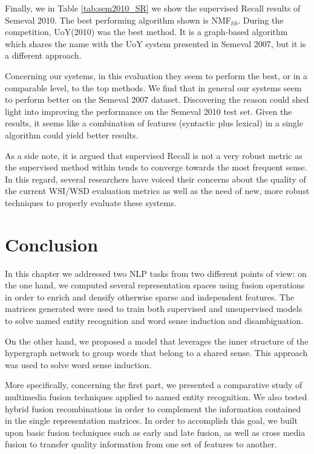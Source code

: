 Finally, we in Table \ref{tab:sem2010_SR} we show the supervised Recall results of Semeval 2010. The best performing algorithm shown is NMF$_{lib}$. During the competition, UoY(2010) was the best method. It is a graph-based algorithm which shares the name with the UoY  system presented in Semeval 2007, but it is a different  approach. 

Concerning our systems, in this evaluation they seem to perform the best, or in a comparable level, to the top methods.  We find that in general our systems seem to perform better on the Semeval 2007 dataset. Discovering the reason could shed light into improving the performance on the Semeval 2010 test set. Given the results, it seems like a combination of features (syntactic plus lexical) in  a single algorithm could yield better results. 

As a side note, it is argued that supervised Recall is not a very robust metric as the supervised method within tends to converge towards the most frequent sense. In this regard, several researchers \cite{VandeCruys2011,pedersen2010duluth} have voiced their concerns about the quality of the current WSI/WSD evaluation metrics as well as the need of new, more robust techniques to properly evaluate these systems.




\section{Conclusion}
\label{chap6:conclusion}
In this chapter we addressed two NLP tasks from two different points of view: on the one hand, we computed several representation spaces using fusion operations in order to enrich and densify otherwise sparse and independent features. The matrices generated were used to train both supervised and unsupervised models to solve named entity recognition and word sense induction and disambiguation.

On the other hand, we proposed a model that leverages the inner structure of the hypergraph network to group words that belong to a shared sense. This approach was used to solve word sense induction.

More specifically, concerning the first part, we presented  a comparative study of multimedia fusion techniques applied to named entity recognition.  We also tested hybrid fusion recombinations in order to complement the information contained in the single representation matrices. In order to accomplish this goal, we built upon basic fusion techniques such as early and late fusion, as well as cross media fusion to transfer quality information from one set of features to another. 

